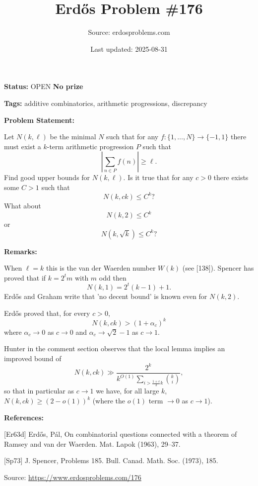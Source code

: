 \documentclass{article}
\title{Erd\H{o}s Problem \#176}
\date{Last updated: 2025-08-31}
\author{Source: erdosproblems.com}
\begin{document}
\maketitle

\noindent\textbf{Status:} OPEN \quad \textbf{No prize}

\noindent\textbf{Tags:} additive combinatorics, arithmetic progressions, discrepancy

\medskip
\noindent\textbf{Problem Statement:}

Let $N(k,\ell)$ be the minimal $N$ such that for any $f:\{1,\ldots,N\}\to\{-1,1\}$ there must exist a $k$-term arithmetic progression $P$ such that\[ \left\lvert \sum_{n\in P}f(n)\right\rvert\geq \ell.\]Find good upper bounds for $N(k,\ell)$. Is it true that for any $c>0$ there exists some $C>1$ such that\[N(k,ck)\leq C^k?\]What about\[N(k,2)\leq C^k\]or\[N(k,\sqrt{k})\leq C^k?\]

\bigskip
\noindent\textbf{Remarks:}

When $\ell=k$ this is the van der Waerden number $W(k)$ (see [138]). Spencer \cite{Sp73} has proved that if $k=2^tm$ with $m$ odd then\[N(k,1)=2^t(k-1)+1.\]Erd\H{o}s and Graham write that 'no decent bound' is known even for $N(k,2)$.

Erd\H{o}s \cite{Er63d} proved that, for every $c>0$,\[N(k,ck)> (1+\alpha_c)^k\]where $\alpha_c\to 0$ as $c\to 0$ and $\alpha_c\to \sqrt{2}-1$ as $c\to 1$. 

Hunter in the comment section observes that the local lemma implies an improved bound of\[N(k,ck) \gg \frac{2^k}{k^{O(1)}\sum_{i>\frac{1+c}{2}k}\binom{k}{i}},\]so that in particular as $c\to 1$ we have, for all large $k$, $N(k,ck)\geq (2-o(1))^k$ (where the $o(1)$ term $\to 0$ as $c\to 1$).

\bigskip
\noindent\textbf{References:}

[Er63d] Erd\H{o}s, P\'{a}l, On combinatorial questions connected with a theorem of
{R}amsey and van der {W}aerden. Mat. Lapok (1963), 29--37.
 
 [Sp73] J. Spencer, Problems 185. Bull. Canad. Math. Soc. (1973), 185.

\bigskip
\noindent\small{Source: \url{https://www.erdosproblems.com/176}}
\end{document}
